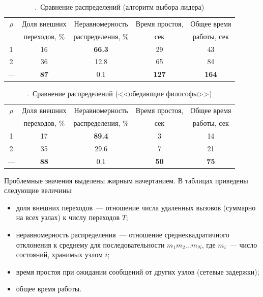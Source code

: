 \documentclass[12pt,a4paper,article]{bpm2}
\begin{document}
\begin{table}[htb]
  \centering
  \begin{tabular}{|c|c|c|c|c|}
    \hline
    $\rho$ & Доля внешних        & Неравномерность   & Время простоя, & Общее время \\
           & переходов, \%       & распределения, \% & сек            & работы, сек                 \\ \hline
    1      & 16                  & \textbf{66.3}     & 29             & 43                  \\ \hline
    2      & 36                  & 12.8              & 65             & 84                  \\ \hline
    ---    & \textbf{87}         & 0.1               & \textbf{127}   & \textbf{164}        \\ \hline
  \end{tabular}
  \caption{.~Сравнение распределений (алгоритм выбора лидера)}
  \label{tab:election-results}
\end{table}

\begin{table}[htb]
  \centering
  \begin{tabular}{|c|c|c|c|c|}
    \hline
    $\rho$ & Доля внешних        & Неравномерность   & Время простоя, & Общее время \\
           & переходов, \%       & распределения, \% & сек            & работы, сек         \\ \hline
    1      & 17                  & \textbf{89.4}     & 3              & 14                  \\ \hline
    2      & 35                  & 29.6              & 7              & 21                  \\ \hline
    ---    & \textbf{88}         & 0.1               & \textbf{50}    & \textbf{75}         \\ \hline
  \end{tabular}
  \caption{.~Сравнение распределений (<<обедающие философы>>)}
  \label{tab:philo-results}
\end{table}


Проблемные значения выделены жирным начертанием. В таблицах приведены следующие величины:

\begin{itemize}
\item доля внешних переходов~--- отношение числа удаленных вызовов (суммарно на всех узлах) к числу переходов $T$;
\item неравномерность распределения~--- отношение среднеквадратичного отклонения к среднему для последовательности $m_1
  m_2 \ldots m_N$, где $m_i$~--- число состояний, хранимых узлом $i$;
\item время простоя при ожидании сообщений от других узлов (сетевые задержки);
\item общее время работы.
\end{itemize}
\end{document}
